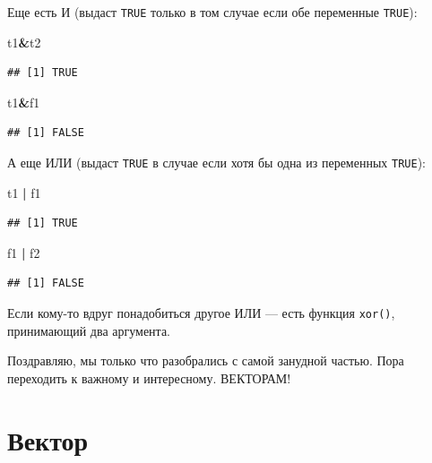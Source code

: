 \documentclass[]{book}
\newenvironment{Shaded}{\begin{snugshade}}{\end{snugshade}}
\newcommand{\NormalTok}[1]{#1}
\newcommand{\OperatorTok}[1]{\textcolor[rgb]{0.81,0.36,0.00}{\textbf{#1}}}
\newcommand{\StringTok}[1]{\textcolor[rgb]{0.31,0.60,0.02}{#1}}
\begin{document}
Еще есть И (выдаст \texttt{TRUE} только в том случае если обе переменные \texttt{TRUE}):

\begin{Shaded}
\begin{Highlighting}[]
\NormalTok{t1}\OperatorTok{&}\NormalTok{t2}
\end{Highlighting}
\end{Shaded}

\begin{verbatim}
## [1] TRUE
\end{verbatim}

\begin{Shaded}
\begin{Highlighting}[]
\NormalTok{t1}\OperatorTok{&}\NormalTok{f1}
\end{Highlighting}
\end{Shaded}

\begin{verbatim}
## [1] FALSE
\end{verbatim}

А еще ИЛИ (выдаст \texttt{TRUE} в случае если хотя бы одна из переменных \texttt{TRUE}):

\begin{Shaded}
\begin{Highlighting}[]
\NormalTok{t1 }\OperatorTok{|}\StringTok{ }\NormalTok{f1}
\end{Highlighting}
\end{Shaded}

\begin{verbatim}
## [1] TRUE
\end{verbatim}

\begin{Shaded}
\begin{Highlighting}[]
\NormalTok{f1 }\OperatorTok{|}\StringTok{ }\NormalTok{f2}
\end{Highlighting}
\end{Shaded}

\begin{verbatim}
## [1] FALSE
\end{verbatim}

Если кому-то вдруг понадобиться другое ИЛИ --- есть функция \texttt{xor()}, принимающий два аргумента.

Поздравляю, мы только что разобрались с самой занудной частью.
Пора переходить к важному и интересному. ВЕКТОРАМ!

\hypertarget{atomic}{%
\section{Вектор}\label{atomic}}
\end{document}
